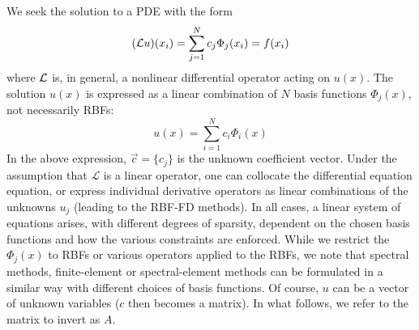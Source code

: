 \documentclass{report}
\begin{document}
{We seek the solution to a PDE with the form
\begin{eqnarray*}
(\mathcal{L}u)(x_i) = \sum_{j=1}^{N} c_j \Phi_j(x_i) = f(x_i)
\end{eqnarray*}
where $\mathcal{L}$ is, in general, a nonlinear differential operator acting on $u(x)$. The solution $u(x)$ is expressed as a linear combination of $N$ basis functions $\Phi_j(x)$, not necessarily RBFs: 
$$
u(x) = \sum_{i=1}^N c_i \Phi_i(x)
$$
In the above expression, 
$ \vec{c} = \{c_j\} $ is the unknown coefficient vector. Under the assumption that $\mathcal{L}$ is a linear operator, one can collocate the differential equation equation, or express individual derivative operators as linear combinations of the unknowns $u_j$ (leading to the RBF-FD methods). 
In all cases, a linear system of equations arises, with different degrees of sparsity, dependent on the chosen basis functions and how the various constraints are enforced.  While we restrict the $\Phi_j(x)$ to RBFs or various operators applied to the RBFs, we note that spectral methods, finite-element or spectral-element methods can be formulated in a similar way with different choices of basis functions.  Of course, $u$ can be a vector of unknown variables ($c$ then becomes a matrix). In what follows, we refer to the matrix to invert as $A$. 
%
%

}
\end{document}

